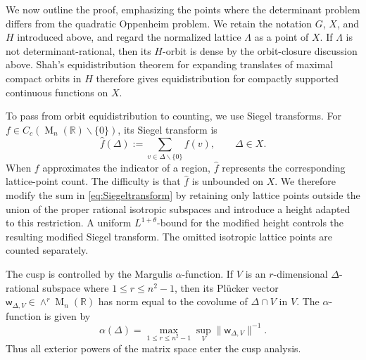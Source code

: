\documentclass[reqno,11pt]{amsart}
\numberwithin{equation}{section}
\theoremstyle{definition}
\theoremstyle{remark}
\newcommand{\op}{\operatorname}
\newcommand{\M}{\op{M}}
\begin{document}
We now outline the proof, emphasizing the points where the determinant
problem differs from the quadratic Oppenheim problem. We retain the notation
$G$, $X$, and $H$ introduced above, and regard the normalized lattice
$\Lambda$ as a point of $X$. If $\Lambda$ is not determinant-rational, then
its $H$-orbit is dense by the orbit-closure discussion above. Shah's equidistribution theorem for expanding translates of maximal compact orbits in $H$ \cite{shah} therefore gives equidistribution for compactly supported continuous functions on $X$.


To pass from orbit equidistribution to counting, we use Siegel transforms.
For $f\in C_c(\M_n(\mathbb R)\smallsetminus\{0\})$, its Siegel
transform is
\begin{equation}\label{eq:Siegeltransform}
    \widehat f(\Delta)
:=
\sum_{v\in\Delta\smallsetminus \{0\}}f(v),
\qquad
\Delta\in X.
\end{equation}
When $f$ approximates the indicator of a region, $\widehat f$ represents the
corresponding lattice-point count. The difficulty is that $\widehat f$ is unbounded on $X$.
We therefore
modify the sum in \eqref{eq:Siegeltransform} by retaining only lattice points outside the union of
the proper rational isotropic subspaces and introduce a height adapted
to this restriction. A uniform $L^{1+\theta}$-bound for the modified height
controls the resulting modified Siegel transform. The omitted isotropic
lattice points are counted separately.


The cusp is controlled by the Margulis $\alpha$-function. If $V$ is an
$r$-dimensional $\Delta$-rational subspace where $1\le r\le n^2-1$, then its Pl\"ucker vector
$\mathsf w_{\Delta,V}\in\wedge^r\M_n(\mathbb R)$
has norm equal to the covolume of $\Delta\cap V$ in $V$. The $\alpha$-function is given by
$$
\alpha(\Delta)
=
\max_{1\le r\le n^2-1}
\sup_V
\|\mathsf w_{\Delta,V}\|^{-1}.
$$
 Thus all exterior powers of the matrix space enter the cusp analysis.
\end{document}
